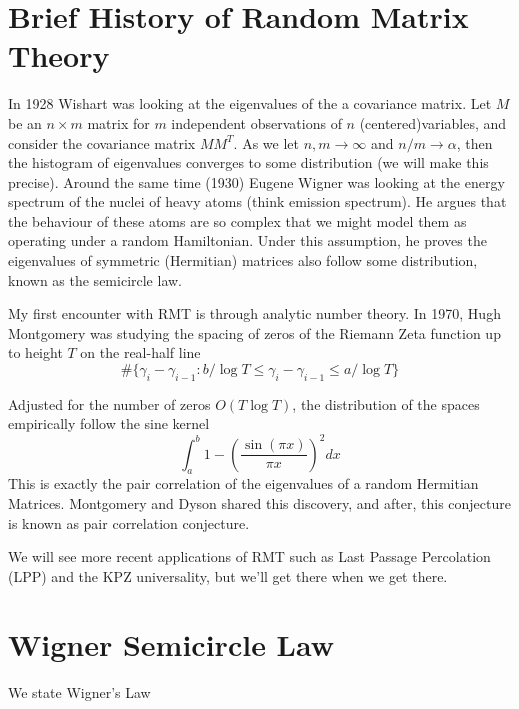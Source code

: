 \section{Brief History of Random Matrix Theory}
In 1928 Wishart was looking at the eigenvalues of the a covariance matrix. Let $M$ be an $n \times m$ matrix for $m$ independent observations of $n$ (centered)variables, and consider the covariance matrix $MM^T$. As we let $n,m\to \infty$ and $n/m\to \alpha$, then the histogram of eigenvalues converges to some distribution (we will make this precise). Around the same time (1930) Eugene Wigner was looking at the energy spectrum of the nuclei of heavy atoms (think emission spectrum). He argues that the behaviour of these atoms are so complex that we might model them as operating under a random Hamiltonian. Under this assumption, he proves the eigenvalues of symmetric (Hermitian) matrices also follow some distribution, known as the semicircle law.

My first encounter with RMT is through analytic number theory. In 1970, Hugh Montgomery was studying the spacing of zeros of the Riemann Zeta function up to height $T$ on the real-half line \[
\# \{\gamma_i-\gamma_{i-1} : b/\log T \leq \gamma_i-\gamma_{i-1}\leq a/\log T  \}
\]

Adjusted for the number of zeros $O(T\log T)$, the distribution of the spaces empirically follow the sine kernel
\[
\int_a^b 1-\left(\frac{\sin(\pi x)}{\pi x}\right)^2 dx
\]
This is exactly the pair correlation of the eigenvalues of a random Hermitian Matrices. Montgomery and Dyson shared this discovery, and after, this conjecture is known as pair correlation conjecture.

We will see more recent applications of RMT such as Last Passage Percolation (LPP) and the KPZ universality, but we'll get there when we get there.

\section{Wigner Semicircle Law}

We state Wigner's Law 


